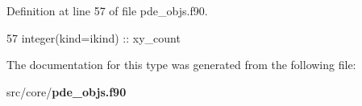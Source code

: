 Definition at line 57 of file pde\+\_\+objs.\+f90.


\begin{DoxyCode}
57     \textcolor{keywordtype}{integer(kind=ikind)} :: xy\_count
\end{DoxyCode}


The documentation for this type was generated from the following file\+:\begin{DoxyCompactItemize}
\item 
src/core/{\bf pde\+\_\+objs.\+f90}\end{DoxyCompactItemize}
